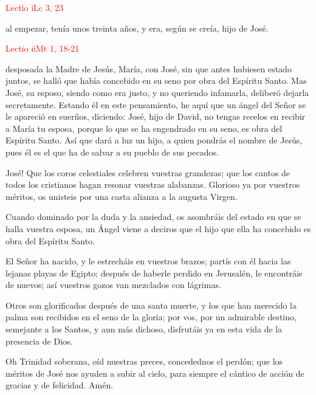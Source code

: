 \noindent\textcolor{red}{Lectio i\hfill Lc 3, 23}

al empezar, tenía unos treinta años, y era, según se creía, hijo de José.

\vspace{2mm}

\noindent\textcolor{red}{Lectio ii\hfill Mt 1, 18-21}

desposada la Madre de Jesús, María, con José, sin que antes hubiesen estado juntos, se halló que había concebido en su seno por obra del Espíritu Santo. Mas José, su esposo,
siendo como era justo, y no queriendo infamarla, deliberó dejarla secretamente. Estando él en este pensamiento, he aquí que un ángel del Señor se le apareció en suerños, diciendo:
José, hijo de David, no tengas recelos en recibir a María tu esposa, porque lo que se ha engendrado en su seno, es obra del Espíritu Santo. Así que dará a luz un hijo, a quien pondrás
el nombre de Jesús, pues él es el que ha de salvar a su pueblo de sus pecados.
\vspace{2mm}

\begin{otherlanguage}{latin}
      

      \vspace{1mm}

      

      \vspace{1mm}

      

\end{otherlanguage}

\vspace{2mm}

José! Que los coros celestiales celebren vuestras grandezas; que los cantos de todos los cristianos hagan resonar vuestras alabanzas. Glorioso ya por vuestros méritos, os
unisteis por una casta alianza a la augusta Virgen.

Cuando dominado por la duda y la ansiedad, os asombráis del estado en que se halla vuestra esposa, un Ángel viene a deciros que el hijo que ella ha concebido es obra del Espíritu Santo.

El Señor ha nacido, y le estrecháis en vuestros brazos; partís con él hacia las lejanas playas de Egipto; después de haberle perdido en Jerusalén, le encontráis de nuevos; así vuestros gozos
van mezclados con lágrimas.

Otros son glorificados después de una santa muerte, y los que han merecido la palma son recibidos en el seno de la gloria; por vos, por un admirable destino, semejante a los Santos, y aun
más dichoso, disfrutáis ya en esta vida de la presencia de Dios.

Oh Trinidad soberana, oíd nuestras preces, concedednos el perdón; que los méritos de José nos ayuden a subir al cielo, para siempre el cántico de acción de gracias y de felicidad. Amén.